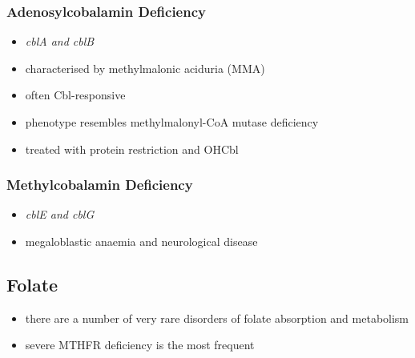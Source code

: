 \documentclass{scrartcl}
\begin{document}
\subsubsection{Adenosylcobalamin Deficiency}
\label{sec:orgf8bb7aa}
\begin{itemize}
\item \emph{cblA and cblB}
\item characterised by methylmalonic aciduria (MMA)
\item often Cbl-responsive
\item phenotype resembles methylmalonyl-CoA mutase deficiency
\item treated with protein restriction and OHCbl
\end{itemize}

\subsubsection{Methylcobalamin Deficiency}
\label{sec:org1084dcf}
\begin{itemize}
\item \emph{cblE and cblG}
\item megaloblastic anaemia and neurological disease
\end{itemize}
\subsection{Folate}
\label{sec:orge9f0580}
\begin{itemize}
\item there are a number of very rare disorders of folate absorption and metabolism
\item severe MTHFR deficiency is the most frequent
\end{itemize}
\end{document}
